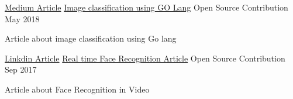 

\begin{cventries}


  \cventry
    {\href{https://medium.com/@ishwarsawale/image-classification-with-go-lang-d72eef451597}{Medium Article}} %
    {\href{https://medium.com/@ishwarsawale/image-classification-with-go-lang-d72eef451597}{Image classification using GO Lang}} %
    {Open Source Contribution} %
    {May 2018} %
    {
      \begin{cvitems} %
        \item {Article about image classification using Go lang}
      \end{cvitems}
    }

  \cventry
    {\href{https://www.linkedin.com/pulse/real-time-face-recognition-using-facenet-ishwar-sawale/}{Linkdin Article}} %
    {\href{https://www.linkedin.com/pulse/real-time-face-recognition-using-facenet-ishwar-sawale/}{Real time Face Recognition Article}} %
    {Open Source Contribution} %
    {Sep 2017} %
    {
      \begin{cvitems} %
        \item {Article about Face Recognition in Video}
      \end{cvitems}
    }


\end{cventries}
